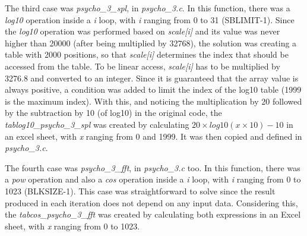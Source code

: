 \begin{comment}
\begin{figure}[H]
\centerline{\fbox{\texttt{[image: init.pdf]}}}
\caption{\textit{psycho\_3\_init\_add\_db} function.}
\label{init}
\end{figure}
\end{comment}


The third case was \textit{psycho\_3\_spl}, in \textit{psycho\_3.c}. In this function, there was a \textit{log10} operation inside a \textit{i} loop, with \textit{i} ranging from 0 to 31 (SBLIMIT-1). Since the \textit{log10} operation was performed based on \textit{scale[i]} and its value was never higher than 20000 (after being multiplied by 32768), the solution was creating a table with 2000 positions, so that \textit{scale[i]} determines the index that should be accessed from the table. 
To be linear access, \textit{scale[i]} has to be multiplied by 3276.8 and converted to an integer. Since it is guaranteed that the array value is always positive, a condition was added to limit the index of the log10 table (1999 is the maximum index). With this, and noticing the multiplication by 20 followed by the subtraction by 10 (of log10) in the original code, the \textit{tablog10\_psycho\_3\_spl} was created by calculating $20\times log10(x\times 10)-10$ in an excel sheet, with \textit{x} ranging from 0 and 1999. It was then copied and defined in \textit{psycho\_3.c}.

\begin{comment}
\begin{figure}[H]
\centerline{\fbox{\texttt{[image: spl.pdf]}}}
\caption{\textit{psycho\_3\_spl} function.}
\label{spl}
\end{figure}

\vspace{1cm}
\end{comment}

The fourth case was \textit{psycho\_3\_fft}, in \textit{psycho\_3.c} too. In this function, there was a \textit{pow} operation and also a \textit{cos} operation inside a \textit{i} loop, with \textit{i} ranging from 0 to 1023 (BLKSIZE-1). This case was straightforward to solve since the result produced in each iteration does not depend on any input data. Considering this, the \textit{tabcos\_psycho\_3\_fft} was created by calculating both expressions in an Excel sheet, with \textit{x} ranging from 0 to 1023.

